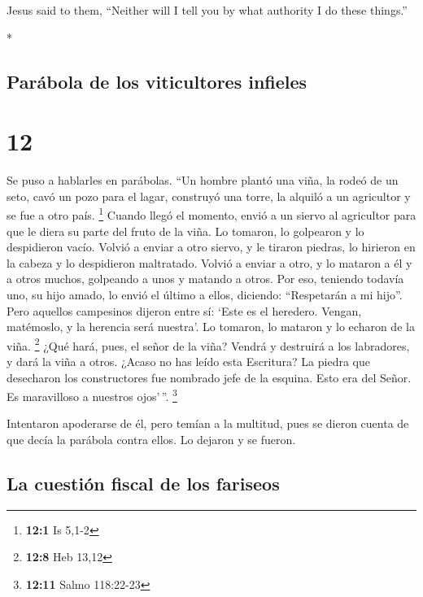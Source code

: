 \begin{paracol}{2}
\begin{otherlanguage}{english}
Jesus said to them, ``Neither will I tell you by what authority I do
these things.''

\end{otherlanguage}

\switchcolumn[0]*

\hypertarget{paruxe1bola-de-los-viticultores-infieles}{%
\subsection{Parábola de los viticultores
infieles}\label{paruxe1bola-de-los-viticultores-infieles}}

\hypertarget{section-22}{%
\section{12}\label{section-22}}

 Se puso a hablarles en parábolas. ``Un hombre plantó una
viña, la rodeó de un seto, cavó un pozo para el lagar, construyó una
torre, la alquiló a un agricultor y se fue a otro país. \footnote{\textbf{12:1}
  Is 5,1-2}  Cuando llegó el momento, envió a un siervo al
agricultor para que le diera su parte del fruto de la viña.
 Lo tomaron, lo golpearon y lo despidieron vacío.
 Volvió a enviar a otro siervo, y le tiraron piedras, lo
hirieron en la cabeza y lo despidieron maltratado.  Volvió
a enviar a otro, y lo mataron a él y a otros muchos, golpeando a unos y
matando a otros.  Por eso, teniendo todavía uno, su hijo
amado, lo envió el último a ellos, diciendo: ``Respetarán a mi hijo''.
 Pero aquellos campesinos dijeron entre sí: `Este es el
heredero. Vengan, matémoslo, y la herencia será nuestra'. 
Lo tomaron, lo mataron y lo echaron de la viña. \footnote{\textbf{12:8}
  Heb 13,12}  ¿Qué hará, pues, el señor de la viña? Vendrá
y destruirá a los labradores, y dará la viña a otros. 
¿Acaso no has leído esta Escritura? La piedra que desecharon los
constructores fue nombrado jefe de la esquina.  Esto era
del Señor. Es maravilloso a nuestros ojos'\,''. \footnote{\textbf{12:11}
  Salmo 118:22-23}

 Intentaron apoderarse de él, pero temían a la multitud,
pues se dieron cuenta de que decía la parábola contra ellos. Lo dejaron
y se fueron.

\hypertarget{la-cuestiuxf3n-fiscal-de-los-fariseos}{%
\subsection{La cuestión fiscal de los
fariseos}\label{la-cuestiuxf3n-fiscal-de-los-fariseos}}


\end{paracol}
